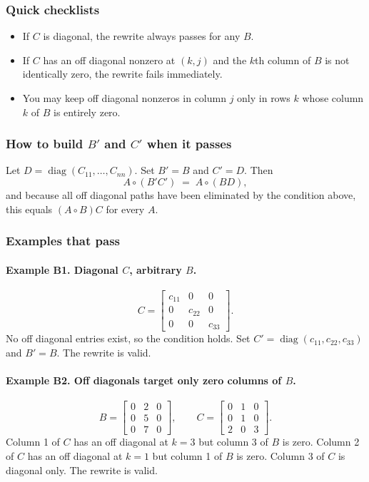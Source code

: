 \documentclass[11pt,a4paper]{article}
\theoremstyle{definition}
\newcommand{\Had}{\circ}
\newcommand{\diag}{\operatorname{diag}}
\begin{document}
\subsubsection*{Quick checklists}
\begin{itemize}
  \item If $C$ is diagonal, the rewrite always passes for any $B$.
  \item If $C$ has an off diagonal nonzero at $(k,j)$ and the $k$th column of $B$ is not identically zero, the rewrite fails immediately.
  \item You may keep off diagonal nonzeros in column $j$ only in rows $k$ whose column $k$ of $B$ is entirely zero.
\end{itemize}

\subsubsection*{How to build $B'$ and $C'$ when it passes}
Let $D=\diag(C_{11},\dots,C_{nn})$. Set $B'=B$ and $C'=D$. Then
\[
A \Had (B' C') \;=\; A \Had (B D),
\]
and because all off diagonal paths have been eliminated by the condition above, this equals $(A \Had B) C$ for every $A$.

\subsubsection*{Examples that pass}
\paragraph{Example B1. Diagonal $C$, arbitrary $B$.}
\[
C=\begin{bmatrix}
c_{11}&0&0\\
0&c_{22}&0\\
0&0&c_{33}
\end{bmatrix}.
\]
No off diagonal entries exist, so the condition holds. Set $C'=\diag(c_{11},c_{22},c_{33})$ and $B'=B$. The rewrite is valid.

\paragraph{Example B2. Off diagonals target only zero columns of $B$.}
\[
B=\begin{bmatrix}
0&2&0\\
0&5&0\\
0&7&0
\end{bmatrix},
\qquad
C=\begin{bmatrix}
0&1&0\\
0&1&0\\
2&0&3
\end{bmatrix}.
\]
Column 1 of $C$ has an off diagonal at $k=3$ but column 3 of $B$ is zero.  
Column 2 of $C$ has an off diagonal at $k=1$ but column 1 of $B$ is zero.  
Column 3 of $C$ is diagonal only. The rewrite is valid.
\end{document}
